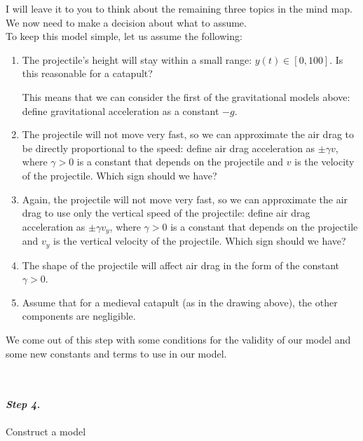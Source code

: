 \begin{example}
I will leave it to you to think about the remaining three topics in the mind map. \\


We now need to make a decision about what to assume. \\

To keep this model simple, let us assume the following:
\begin{enumerate}
	\item The projectile's height will stay within a small range: $y(t) \in [0,100]$. Is this reasonable for a catapult?

		This means that we can consider the first of the gravitational models above: define gravitational acceleration as a constant $-g$.
		
	\item The projectile will not move very fast, so we can approximate the air drag to be directly proportional to the speed: define air drag acceleration as $\pm \gamma v$, where $\gamma>0$ is a constant that depends on the projectile and $v$ is the velocity of the projectile. Which sign should we have?

	\item Again, the projectile will not move very fast, so we can approximate the air drag to use only the vertical speed of the projectile: define air drag acceleration as $\pm \gamma v_y$, where $\gamma>0$ is a constant that depends on the projectile and $v_y$ is the vertical velocity of the projectile. Which sign should we have?

	\item The shape of the projectile will affect air drag in the form of the constant $\gamma>0$.

	\item Assume that for a medieval catapult (as in the drawing above), the other components are negligible.

\end{enumerate}

We come out of this step with some conditions for the validity of our model and some new constants and terms to use in our model.

\end{example}

\hfill \\

\paragraph{\emph{Step 4.}} Construct a model \\

